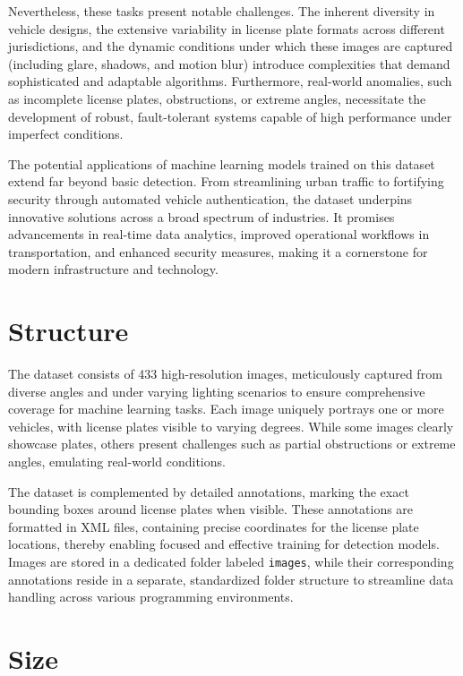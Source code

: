 Nevertheless, these tasks present notable challenges. The inherent diversity in vehicle designs, the extensive variability in license plate formats across different jurisdictions, and the dynamic conditions under which these images are captured (including glare, shadows, and motion blur) introduce complexities that demand sophisticated and adaptable algorithms. Furthermore, real-world anomalies, such as incomplete license plates, obstructions, or extreme angles, necessitate the development of robust, fault-tolerant systems capable of high performance under imperfect conditions.

The potential applications of machine learning models trained on this dataset extend far beyond basic detection. From streamlining urban traffic to fortifying security through automated vehicle authentication, the dataset underpins innovative solutions across a broad spectrum of industries. It promises advancements in real-time data analytics, improved operational workflows in transportation, and enhanced security measures, making it a cornerstone for modern infrastructure and technology.

\section{Structure}

The dataset consists of 433 high-resolution images, meticulously captured from diverse angles and under varying lighting scenarios to ensure comprehensive coverage for machine learning tasks. Each image uniquely portrays one or more vehicles, with license plates visible to varying degrees. While some images clearly showcase plates, others present challenges such as partial obstructions or extreme angles, emulating real-world conditions.

The dataset is complemented by detailed annotations, marking the exact bounding boxes around license plates when visible. These annotations are formatted in XML files, containing precise coordinates for the license plate locations, thereby enabling focused and effective training for detection models. Images are stored in a dedicated folder labeled \texttt{images}, while their corresponding annotations reside in a separate, standardized folder structure to streamline data handling across various programming environments.

\section{Size}

